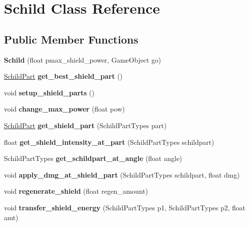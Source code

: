 \hypertarget{class_schild}{}\section{Schild Class Reference}
\label{class_schild}
\subsection*{Public Member Functions}
\begin{DoxyCompactItemize}
\item 
\mbox{\label{class_schild_a40ef8f568674cf3706e6bf6683ffaaa6}} 
{\bfseries Schild} (float pmax\+\_\+shield\+\_\+power, Game\+Object go)
\item 
\mbox{\label{class_schild_a5e7107bb7b35569a16e6fb45bfa7230b}} 
\hyperlink{class_schild_part}{Schild\+Part} {\bfseries get\+\_\+best\+\_\+shield\+\_\+part} ()
\item 
\mbox{\label{class_schild_a13b9f5d46a031c99ed3bccef5c8cf2d1}} 
void {\bfseries setup\+\_\+shield\+\_\+parts} ()
\item 
\mbox{\label{class_schild_ab889daf4cdcc877ea186e41838fbdba8}} 
void {\bfseries change\+\_\+max\+\_\+power} (float pow)
\item 
\mbox{\label{class_schild_aacef9213526f55a636e20129cff6c9ec}} 
\hyperlink{class_schild_part}{Schild\+Part} {\bfseries get\+\_\+shield\+\_\+part} (Schild\+Part\+Types part)
\item 
\mbox{\label{class_schild_aaa9cdd476e49e4712023945c708a2f98}} 
float {\bfseries get\+\_\+shield\+\_\+intensity\+\_\+at\+\_\+part} (Schild\+Part\+Types schildpart)
\item 
\mbox{\label{class_schild_a53308fc46c6b82a05723d1acab5065ad}} 
Schild\+Part\+Types {\bfseries get\+\_\+schildpart\+\_\+at\+\_\+angle} (float angle)
\item 
\mbox{\label{class_schild_ac7c947e063505ef589837985abb3757e}} 
void {\bfseries apply\+\_\+dmg\+\_\+at\+\_\+shield\+\_\+part} (Schild\+Part\+Types schildpart, float dmg)
\item 
\mbox{\label{class_schild_aecafbed64885f445ade907525947e05d}} 
void {\bfseries regenerate\+\_\+shield} (float regen\+\_\+amount)
\item 
\mbox{\label{class_schild_ab1131b0d35fe75404fffa90725546c67}} 
void {\bfseries transfer\+\_\+shield\+\_\+energy} (Schild\+Part\+Types p1, Schild\+Part\+Types p2, float amt)
\end{DoxyCompactItemize}
